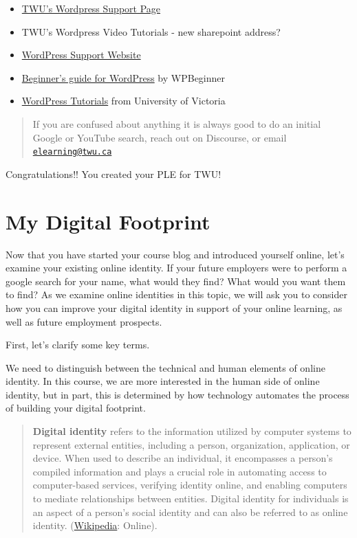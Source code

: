 \documentclass[
]{book}
\theoremstyle{definition}
\theoremstyle{definition}
\theoremstyle{definition}
\theoremstyle{definition}
\theoremstyle{remark}
\begin{document}
\begin{reflect}
\begin{itemize}
\item
  \href{https://www.twu.ca/academics/academic-professional-support/online-learning-resources/wordpress}{TWU's Wordpress Support Page}
\item
  TWU's Wordpress Video Tutorials - new sharepoint address?
\item
  \href{https://wordpress.com/support/}{WordPress Support Website}
\item
  \href{https://www.wpbeginner.com/start-here/}{Beginner's guide for WordPress} by WPBeginner
\item
  \href{https://onlineacademiccommunity.uvic.ca/wordpress-tutorials/}{WordPress Tutorials} from University of Victoria
\end{itemize}

\begin{quote}
If you are confused about anything it is always good to do an initial Google or YouTube search, reach out on Discourse, or email \href{mailto:elearning@twu.ca}{\nolinkurl{elearning@twu.ca}}
\end{quote}
\end{reflect}

Congratulations!! You created your PLE for TWU!

\hypertarget{my-digital-footprint}{%
\section{My Digital Footprint}\label{my-digital-footprint}}

Now that you have started your course blog and introduced yourself online, let's examine your existing online identity. If your future employers were to perform a google search for your name, what would they find? What would you want them to find? As we examine online identities in this topic, we will ask you to consider how you can improve your digital identity in support of your online learning, as well as future employment prospects.

First, let's clarify some key terms.

We need to distinguish between the technical and human elements of online identity. In this course, we are more interested in the human side of online identity, but in part, this is determined by how technology automates the process of building your digital footprint.

\begin{quote}
\textbf{Digital identity} refers to the information utilized by computer systems to represent external entities, including a person, organization, application, or device. When used to describe an individual, it encompasses a person's compiled information and plays a crucial role in automating access to computer-based services, verifying identity online, and enabling computers to mediate relationships between entities. Digital identity for individuals is an aspect of a person's social identity and can also be referred to as online identity. (\href{https://en.wikipedia.org/wiki/Digital_identity}{Wikipedia}: Online).
\end{quote}
\end{document}

